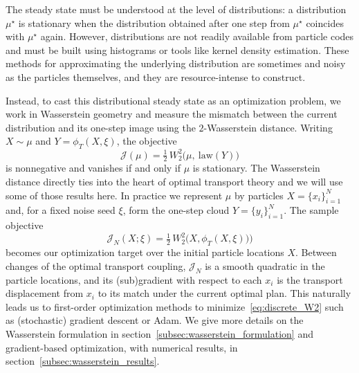 \documentclass{article}
\begin{document}
The steady state must be understood at the level of distributions: a distribution $\mu^\star$ is stationary when the distribution obtained after one step from $\mu^\star$ coincides with $\mu^\star$ again. However, distributions are not readily available from particle codes and must be built using histograms or tools like kernel density estimation. These methods for approximating the underlying distribution are sometimes and noisy as the particles themselves, and they are resource-intense to construct.

Instead, to cast this distributional steady state as an optimization problem, we work in Wasserstein geometry and measure the mismatch between the current distribution and its one-step image using the $2$-Wasserstein distance. Writing $X \sim \mu$ and $Y=\phi_T(X,\xi)$, the objective
\begin{equation}
    \mathcal{J}(\mu) = \tfrac12\,W_2^2\!\big(\mu,\ \text{law}(Y)\big)
\end{equation}
is nonnegative and vanishes if and only if $\mu$ is stationary. The Wasserstein distance directly ties into the heart of optimal transport theory and we will use some of those results here. In practice we represent $\mu$ by particles $X=\{x_i\}_{i=1}^N$ and, for a fixed noise seed $\xi$, form the one-step cloud $Y=\{y_i\}_{i=1}^N$. The sample objective
\begin{equation} \label{eq:discrete_W2}
    \mathcal{J}_N(X;\xi)= \tfrac12\,W_2^2\!\big(X, \phi_T(X,\xi))\big)
\end{equation}
becomes our optimization target over the initial particle locations $X$. Between changes of the optimal transport coupling, $\mathcal{J}_N$ is a smooth quadratic in the particle locations, and its (sub)gradient with respect to each $x_i$ is the transport displacement from $x_i$ to its match under the current optimal plan. This naturally leads us to first-order optimization methods to minimize~\eqref{eq:discrete_W2} such as (stochastic) gradient descent or Adam. We give more details on the Wasserstein formulation in section~\ref{subsec:wasserstein_formulation} and gradient-based optimization, with numerical results, in section~\ref{subsec:wasserstein_results}.
\end{document}
